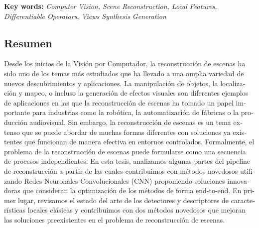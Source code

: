 \vspace{1mm}
\textbf{Key words:} \textit{Computer Vision, Scene Reconstruction, Local Features, Differentiable Operators, Views Synthesis Generation}


\begin{otherlanguage}{spanish}
\chapter*{Resumen}

\vspace{-24mm}

Desde los inicios de la Visión por Computador, la reconstrucción de escenas ha sido uno de los temas más estudiados que ha llevado a una amplia variedad de nuevos descubrimientos y aplicaciones. La manipulación de objetos, la localización y mapeo, o incluso la generación de efectos visuales son diferentes ejemplos de aplicaciones en las que la reconstrucción de escenas ha tomado un papel importante para industrias como la robótica, la automatización de fábricas o la producción audiovisual. Sin embargo, la reconstrucción de escenas es un tema extenso que se puede abordar de muchas formas diferentes con soluciones ya existentes que funcionan de manera efectiva en entornos controlados. Formalmente, el problema de la reconstrucción de escenas puede formularse como una secuencia de procesos independientes. En esta tesis, analizamos algunas partes del pipeline de reconstrucción a partir de las cuales contribuimos con métodos novedosos utilizando Redes Neuronales Convolucionales (CNN) proponiendo soluciones innovadoras que consideran la optimización de los métodos de forma end-to-end. En primer lugar, revisamos el estado del arte de los detectores y descriptores de características locales clásicas y contribuimos con dos métodos novedosos que mejoran las soluciones preexistentes en el problema de reconstrucción de escenas.


\end{otherlanguage}
